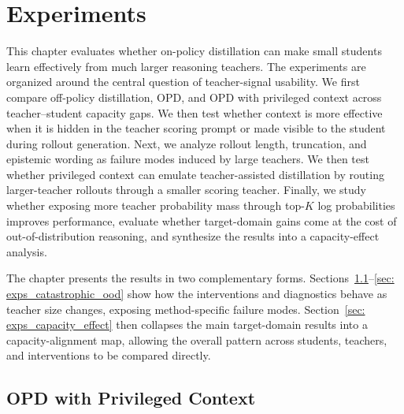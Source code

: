 \chapter{Experiments}

This chapter evaluates whether on-policy distillation can make small students learn effectively from much larger reasoning teachers. The experiments are organized around the central question of teacher-signal usability. We first compare off-policy distillation, OPD, and OPD with privileged context across teacher--student capacity gaps. We then test whether context is more effective when it is hidden in the teacher scoring prompt or made visible to the student during rollout generation. Next, we analyze rollout length, truncation, and epistemic wording as failure modes induced by large teachers. We then test whether privileged context can emulate teacher-assisted distillation by routing larger-teacher rollouts through a smaller scoring teacher. Finally, we study whether exposing more teacher probability mass through top-$K$ log probabilities improves performance, evaluate whether target-domain gains come at the cost of out-of-distribution reasoning, and synthesize the results into a capacity-effect analysis.

The chapter presents the results in two complementary forms. Sections~\ref{sec: exp_opd_and_pc}--\ref{sec: exps_catastrophic_ood} show how the interventions and diagnostics behave as teacher size changes, exposing method-specific failure modes. Section~\ref{sec: exps_capacity_effect} then collapses the main target-domain results into a capacity-alignment map, allowing the overall pattern across students, teachers, and interventions to be compared directly.

\section{OPD with Privileged Context} \label{sec: exp_opd_and_pc}

